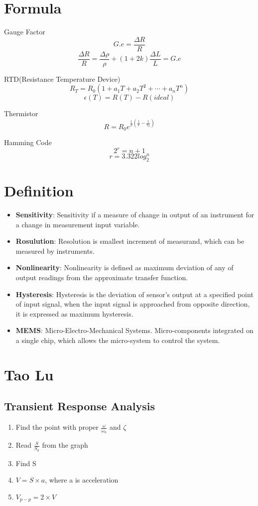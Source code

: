 \documentclass{article}
\begin{document}
\LARGE
  \section{Formula}
Gauge Factor $$ G.e = \frac{\Delta R}{R} $$
$$\frac{\Delta R}{R} = \frac{\Delta \rho}{\rho} + (1+2k)\frac{\Delta L}{L} = G.e$$

RTD(Resistance Temperature Device) 
$$R_T = R_0(1+a_1T + a_2T^2 + \cdots + a_nT^n)$$
$$\epsilon(T) = R(T) - R(ideal)$$


Thermistor
$$R = R_0e^{\frac{1}{\beta}(\frac{1}{T} - \frac{1}{T_0})}$$

Hamming Code
$$2^r = n+1$$
$$ r = 3.322log_2^n$$
   \section{Definition}
   \begin{itemize}
    \item \textbf{Sensitivity}: Sensitivity if a measure of change in output of an instrument for a change in measurement input variable.
    \item \textbf{Rosulution}: Resolution is smallest increment of measurand, which can be measured by instruments.
    
    \item \textbf{Nonlinearity}: Nonlinearity is defined as maximum deviation of any of output readings from the approximate transfer function.
    
    \item \textbf{Hysteresis}: Hysteresis is the deviation of sensor's output at a specified point of input signal, when the input signal is approached from opposite direction, it is expressed as maximum hysteresis.
    
    \item \textbf{MEMS}: Micro-Electro-Mechanical Systems. Micro-components integrated on a single chip, which allows the micro-system to control the system.
   \end{itemize}
\section{Tao Lu}
  \subsection{Transient Response Analysis}
  \begin{enumerate}
   \item Find the point with proper $\frac{\omega}{\omega_n}$ and $\zeta$
   \item Read $\frac{S}{S_0}$ from the graph
   \item Find S
   \item $V = S \times a$, where a is acceleration
   \item $V_{p-p} = 2\times V$
  \end{enumerate}
  
\end{document}
